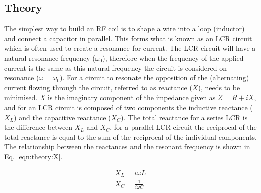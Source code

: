 \subsection{Theory}




The simplest way to build an \ac{RF} coil is to shape a wire into a loop (inductor) and connect a capacitor in parallel. This forms what is known as an LCR circuit which is often used to create a resonance for current. The LCR circuit will have a natural resonance frequency ($\omega_0$), therefore when the frequency of the applied current is the same as this natural frequency the circuit is considered on resonance ($\omega=\omega_0$). For a circuit to resonate the opposition of the (alternating) current flowing through the circuit, referred to as reactance ($X$), needs to be minimised. $X$ is the imaginary component of the impedance given as $Z = R+iX$, and for an LCR circuit is composed of two components the inductive reactance ($X_L$) and the capacitive reactance ($X_C$). The total reactance for a series LCR is the difference between $X_L$ and $X_C$, for a parallel LCR circuit the reciprocal of the total reactance is equal to the sum of the reciprocal of the individual components. The relationship between the reactances and the resonant frequency is shown in Eq. \ref{eqn:theory:X}.

\begin{equation}
\begin{gathered}
    X_L = i\omega L \\
    X_C = \frac{1}{i\omega C}
    \label{eqn:theory:X}
\end{gathered}
\end{equation}

